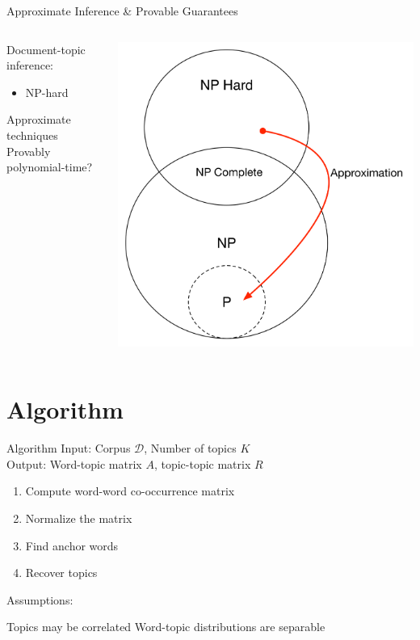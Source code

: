 \documentclass{lecture}
\begin{document}
\begin{plain}{Approximate Inference \& Provable Guarantees}
\begin{columns}
\begin{itemize}
	\p Document-topic inference:
	\begin{itemize}
		\item NP-hard
	\end{itemize}	
	\p Approximate techniques
	\p Provably polynomial-time?
\end{itemize}
\includegraphics[scale=0.4]{figs/np_approx}
\end{columns}
\end{plain}


\section[Algo]{Algorithm}

\begin{plain}{Algorithm}
Input: Corpus $\mathcal{D}$, Number of topics $K$\\
\vspace{1ex}
Output: Word-topic matrix $A$, topic-topic matrix $R$\\
\begin{enumerate}
	\item Compute word-word co-occurrence matrix
	\item Normalize the matrix
	\item Find anchor words
	\item Recover topics
\end{enumerate}
\vspace{1ex}
Assumptions:
	\begin{itemize}
		\p Topics may be correlated
		\p Word-topic distributions are separable
	\end{itemize}
\end{plain}
\end{document}
